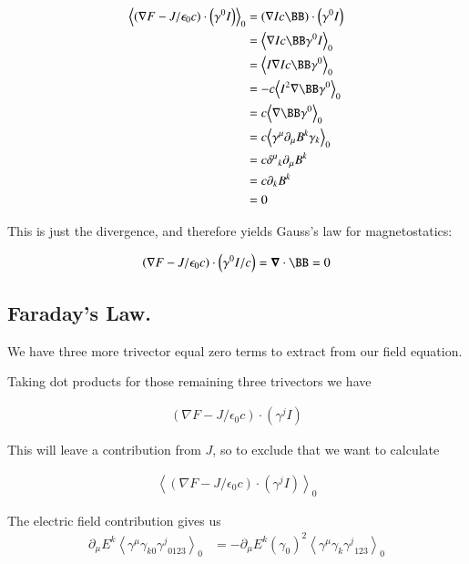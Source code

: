 \documentclass{article}      %
\newcommand{\gpgrade}[2] {{\left\langle{{#1}}\right\rangle}_{#2}}
\newcommand{\gpgradezero}[1] {\gpgrade{#1}{0}}
\newcommand{\grad}[0]{\nabla}
\newcommand{\spacegrad}[0]{\boldsymbol{\nabla}}
\begin{document}
\begin{align*}
\gpgradezero{\left(\grad F - J/\epsilon_0 c\right) \cdot \left(\gamma^0 I\right)}
&= (\grad I c \BB) \cdot \left(\gamma^0 I\right) \\
&= \gpgradezero{ \grad I c \BB \gamma^0 I } \\
&= \gpgradezero{ I \grad I c \BB \gamma^0 } \\
&= - c \gpgradezero{ I^2 \grad \BB \gamma^0 } \\
&= c \gpgradezero{ \grad \BB \gamma^0 } \\
&= c \gpgradezero{ \gamma^{\mu} \partial_{\mu} B^k \gamma_k } \\
&= c {\delta^{\mu}}_k \partial_{\mu} B^k \\
&= c \partial_{k} B^k \\
&= 0
\end{align*}

This is just the divergence, and therefore yields Gauss's law for magnetostatics:

\begin{equation}\label{eqn:gaussmagnet}
\left(\grad F - J/\epsilon_0 c\right) \cdot \left(\gamma^0 I / c \right) = \spacegrad \cdot \BB = 0
\end{equation}

\subsection{ Faraday's Law. }

We have three more trivector equal zero terms to extract from our field equation.

Taking dot products for those remaining three trivectors we have

\begin{align*}
( \grad F - J/\epsilon_0 c ) \cdot (\gamma^j I)
\end{align*}

This will leave a contribution from $J$, so to exclude that we want to calculate

\begin{align*}
\gpgradezero{( \grad F - J/\epsilon_0 c ) \cdot (\gamma^j I)}
\end{align*}

The electric field contribution gives us
\begin{align*}
\partial_{\mu} E^k \gpgradezero{ \gamma^{\mu} \gamma_{k0} {\gamma^j}_{0123} } 
&=
-\partial_{\mu} E^k (\gamma_0)^2 \gpgradezero{ \gamma^{\mu} \gamma_{k} {\gamma^j}_{123} }
\end{align*}
\end{document}
